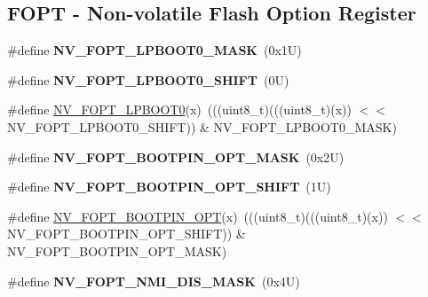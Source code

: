 \subsection*{F\+O\+PT -\/ Non-\/volatile Flash Option Register}
\begin{DoxyCompactItemize}
\item 
\mbox{\label{group___n_v___register___masks_ga47bf10ef60ce96fc8d7fdbd7378d9a52}} 
\#define {\bfseries N\+V\+\_\+\+F\+O\+P\+T\+\_\+\+L\+P\+B\+O\+O\+T0\+\_\+\+M\+A\+SK}~(0x1\+U)
\item 
\mbox{\label{group___n_v___register___masks_ga342e15fe4074c4a1bef9dcd73b312b56}} 
\#define {\bfseries N\+V\+\_\+\+F\+O\+P\+T\+\_\+\+L\+P\+B\+O\+O\+T0\+\_\+\+S\+H\+I\+FT}~(0\+U)
\item 
\#define \mbox{\hyperlink{group___n_v___register___masks_ga68451ed607b7df9fe16a0953ccfd60e9}{N\+V\+\_\+\+F\+O\+P\+T\+\_\+\+L\+P\+B\+O\+O\+T0}}(x)~(((uint8\+\_\+t)(((uint8\+\_\+t)(x)) $<$$<$ N\+V\+\_\+\+F\+O\+P\+T\+\_\+\+L\+P\+B\+O\+O\+T0\+\_\+\+S\+H\+I\+FT)) \& N\+V\+\_\+\+F\+O\+P\+T\+\_\+\+L\+P\+B\+O\+O\+T0\+\_\+\+M\+A\+SK)
\item 
\mbox{\label{group___n_v___register___masks_gac6a79b2efbf75f4a363dc05468aa9e50}} 
\#define {\bfseries N\+V\+\_\+\+F\+O\+P\+T\+\_\+\+B\+O\+O\+T\+P\+I\+N\+\_\+\+O\+P\+T\+\_\+\+M\+A\+SK}~(0x2\+U)
\item 
\mbox{\label{group___n_v___register___masks_gafdfea70753fda4b3ac4d89ec2dc10880}} 
\#define {\bfseries N\+V\+\_\+\+F\+O\+P\+T\+\_\+\+B\+O\+O\+T\+P\+I\+N\+\_\+\+O\+P\+T\+\_\+\+S\+H\+I\+FT}~(1\+U)
\item 
\#define \mbox{\hyperlink{group___n_v___register___masks_ga38a2d58a803f335ebd8cb6ac65bc61b2}{N\+V\+\_\+\+F\+O\+P\+T\+\_\+\+B\+O\+O\+T\+P\+I\+N\+\_\+\+O\+PT}}(x)~(((uint8\+\_\+t)(((uint8\+\_\+t)(x)) $<$$<$ N\+V\+\_\+\+F\+O\+P\+T\+\_\+\+B\+O\+O\+T\+P\+I\+N\+\_\+\+O\+P\+T\+\_\+\+S\+H\+I\+FT)) \& N\+V\+\_\+\+F\+O\+P\+T\+\_\+\+B\+O\+O\+T\+P\+I\+N\+\_\+\+O\+P\+T\+\_\+\+M\+A\+SK)
\item 
\mbox{\label{group___n_v___register___masks_gaa2bcf41c89cbfe86ef8eaf6fff2ad068}} 
\#define {\bfseries N\+V\+\_\+\+F\+O\+P\+T\+\_\+\+N\+M\+I\+\_\+\+D\+I\+S\+\_\+\+M\+A\+SK}~(0x4\+U)

\end{DoxyCompactItemize}
